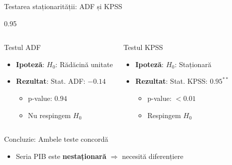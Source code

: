 \documentclass[9pt, aspectratio=169, t]{beamer}
\begin{document}
\begin{frame}{Testarea staționarității: ADF și KPSS}
    \begin{cminipage}{0.95\textwidth}
        \begin{columns}[T]
            \begin{block}{Testul ADF}
                \begin{itemize}\setlength{\itemsep}{0pt}
                    \item \textbf{Ipoteză}: $H_0$: Rădăcină unitate
                    \item \textbf{Rezultat}: Stat. ADF: $-0.14$
                    \begin{itemize}
                        \item p-value: $0.94$
                        \item Nu respingem $H_0$
                    \end{itemize}
                \end{itemize}
            \end{block}
            \begin{exampleblock}{Testul KPSS}
                \begin{itemize}\setlength{\itemsep}{0pt}
                    \item \textbf{Ipoteză}: $H_0$: Staționară
                    \item \textbf{Rezultat}: Stat. KPSS: $0.95^{**}$
                    \begin{itemize}
                        \item p-value: $< 0.01$
                        \item Respingem $H_0$
                    \end{itemize}
                \end{itemize}
            \end{exampleblock}
        \end{columns}
        \vspace{0.2cm}
        \begin{alertblock}{Concluzie: Ambele teste concordă}
            \begin{itemize}\setlength{\itemsep}{0pt}
                \item Seria PIB este \textbf{nestaționară} $\Rightarrow$ necesită diferențiere
            \end{itemize}
        \end{alertblock}
    \end{cminipage}
\end{frame}
\end{document}
